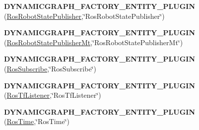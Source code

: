 \begin{DoxyCompactItemize}
\item 
{\bfseries D\+Y\+N\+A\+M\+I\+C\+G\+R\+A\+P\+H\+\_\+\+F\+A\+C\+T\+O\+R\+Y\+\_\+\+E\+N\+T\+I\+T\+Y\+\_\+\+P\+L\+U\+G\+IN} (\hyperlink{classdynamic__graph_1_1RosRobotStatePublisher}{Ros\+Robot\+State\+Publisher},\char`\"{}Ros\+Robot\+State\+Publisher\char`\"{})\hypertarget{namespacedynamic__graph_a0a5d8f5337da169b0f4d831871cc99a9}{}\label{namespacedynamic__graph_a0a5d8f5337da169b0f4d831871cc99a9}

\item 
{\bfseries D\+Y\+N\+A\+M\+I\+C\+G\+R\+A\+P\+H\+\_\+\+F\+A\+C\+T\+O\+R\+Y\+\_\+\+E\+N\+T\+I\+T\+Y\+\_\+\+P\+L\+U\+G\+IN} (\hyperlink{classdynamic__graph_1_1RosRobotStatePublisherMt}{Ros\+Robot\+State\+Publisher\+Mt},\char`\"{}Ros\+Robot\+State\+Publisher\+Mt\char`\"{})\hypertarget{namespacedynamic__graph_a8a74611454379ba67b22e2a1757fa177}{}\label{namespacedynamic__graph_a8a74611454379ba67b22e2a1757fa177}

\item 
{\bfseries D\+Y\+N\+A\+M\+I\+C\+G\+R\+A\+P\+H\+\_\+\+F\+A\+C\+T\+O\+R\+Y\+\_\+\+E\+N\+T\+I\+T\+Y\+\_\+\+P\+L\+U\+G\+IN} (\hyperlink{classdynamic__graph_1_1RosSubscribe}{Ros\+Subscribe},\char`\"{}Ros\+Subscribe\char`\"{})\hypertarget{namespacedynamic__graph_afd7b1f5e2b0f197f5a1013c2cb69d826}{}\label{namespacedynamic__graph_afd7b1f5e2b0f197f5a1013c2cb69d826}

\item 
{\bfseries D\+Y\+N\+A\+M\+I\+C\+G\+R\+A\+P\+H\+\_\+\+F\+A\+C\+T\+O\+R\+Y\+\_\+\+E\+N\+T\+I\+T\+Y\+\_\+\+P\+L\+U\+G\+IN} (\hyperlink{classdynamic__graph_1_1RosTfListener}{Ros\+Tf\+Listener},\char`\"{}Ros\+Tf\+Listener\char`\"{})\hypertarget{namespacedynamic__graph_a54b243d113826d8fabb7e8f089f11da9}{}\label{namespacedynamic__graph_a54b243d113826d8fabb7e8f089f11da9}

\item 
{\bfseries D\+Y\+N\+A\+M\+I\+C\+G\+R\+A\+P\+H\+\_\+\+F\+A\+C\+T\+O\+R\+Y\+\_\+\+E\+N\+T\+I\+T\+Y\+\_\+\+P\+L\+U\+G\+IN} (\hyperlink{classdynamic__graph_1_1RosTime}{Ros\+Time},\char`\"{}Ros\+Time\char`\"{})\hypertarget{namespacedynamic__graph_acab4b73fc7cde9df4e87c7d7d0611f99}{}\label{namespacedynamic__graph_acab4b73fc7cde9df4e87c7d7d0611f99}


\end{DoxyCompactItemize}

